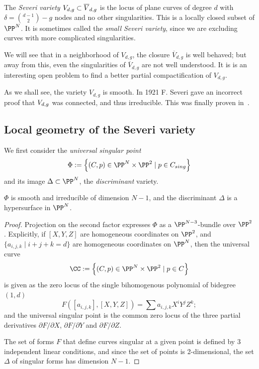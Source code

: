 \begin{propdef}
The \emph{Severi variety} $V_{d,g} \subset \Vdgbar$ is the locus of plane curves of degree $d$ with $\delta = \binom{d-1}{2} - g$ nodes and no other singularities. This is a locally closed subset of $\PP^N$. It is sometimes
called the \emph{small Severi variety}, since we are excluding curves with more complicated singularities.
\end{propdef}


We will see that in a neighborhood of  $ {V}_{d,g}$,  the closure $\overline V_{d,g}$  is well behaved; but away from this,
even the singularities of $\overline V_{d,g}$  are not well understood. It is is an interesting open problem to find a better partial compactification of $ V_{d,g}$. 


\begin{fact}
As we shall see, the variety $V_{d,g}$ is smooth. In 1921 F. Severi gave an incorrect proof that $\Vdg$ was connected, and thus irreducible. This was finally proven in~\cite{MR837522}.
\end{fact}


\subsection{Local geometry of the Severi variety}\label{local severi geometry}

We first consider the \emph{universal singular point}
$$
\Phi := \left\{ (C, p) \in \PP^N \times \PP^2 \mid p \in C_{sing} \right\}
$$
and its image $\Delta\subset \PP^N$, the \emph{discriminant} variety. 

\begin{proposition}
 $\Phi$ is smooth and irreducible of dimension $N-1$, and the discriminant $\Delta$ is a hypersurface in $\PP^N$.
\end{proposition}
\begin{proof}
Projection on the second factor expresses $\Phi$ as a $\PP^{N-3}$-bundle over $\PP^2$. Explicitly, if $[X,Y,Z]$ are homogeneous coordinates on $\PP^2$, and $\{a_{i,j,k} \mid i+j+k = d \}$ are homogeneous coordinates on $\PP^N$, then the universal curve 
$$
\CC := \left\{ (C, p) \in \PP^N \times \PP^2 \mid p \in C \right\}
$$
is given as the zero locus of the single bihomogenous polynomial of bidegree $(1, d)$
$$
F([a_{i,j,k}], [X,Y,Z] ) = \sum a_{i,j,k} X^iY^jZ^k;
$$
and the universal singular point is the common zero locus of the three partial derivatives $\partial F/\partial X$, $\partial F/\partial Y$ and  $\partial F/\partial Z$. 

The set of forms $F$ that define curves singular at a given point is defined by 3 independent linear conditions, and since the set of 
points is 2-dimensional, the set $\Delta$ of singular forms has dimension $N-1$.
\end{proof}
 
